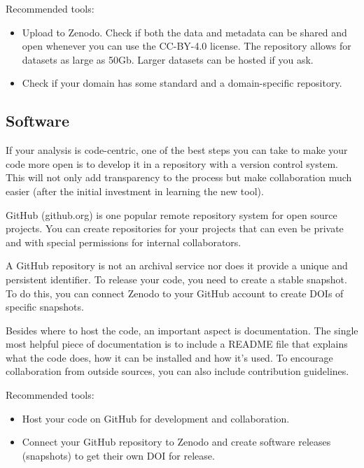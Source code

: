 \documentclass[
  letterpaper,
  DIV=11,
  numbers=noendperiod]{scrreport}
\providecommand{\tightlist}{%
  \setlength{\itemsep}{0pt}\setlength{\parskip}{0pt}}\usepackage{longtable,booktabs,array}
\begin{document}
Recommended tools:

\begin{itemize}
\tightlist
\item
  Upload to Zenodo. Check if both the data and metadata can be shared
  and open whenever you can use the CC-BY-4.0 license. The repository
  allows for datasets as large as 50Gb. Larger datasets can be hosted if
  you ask.
\item
  Check if your domain has some standard and a domain-specific
  repository.
\end{itemize}

\hypertarget{software}{%
\subsection{Software}\label{software}}

If your analysis is code-centric, one of the best steps you can take to
make your code more open is to develop it in a repository with a version
control system. This will not only add transparency to the process but
make collaboration much easier (after the initial investment in learning
the new tool).

GitHub (github.org) is one popular remote repository system for open
source projects. You can create repositories for your projects that can
even be private and with special permissions for internal collaborators.

A GitHub repository is not an archival service nor does it provide a
unique and persistent identifier. To release your code, you need to
create a stable snapshot. To do this, you can connect Zenodo to your
GitHub account to create DOIs of specific snapshots.

Besides where to host the code, an important aspect is documentation.
The single most helpful piece of documentation is to include a README
file that explains what the code does, how it can be installed and how
it's used. To encourage collaboration from outside sources, you can also
include contribution guidelines.

Recommended tools:

\begin{itemize}
\tightlist
\item
  Host your code on GitHub for development and collaboration.
\item
  Connect your GitHub repository to Zenodo and create software releases
  (snapshots) to get their own DOI for release.
\end{itemize}
\end{document}
